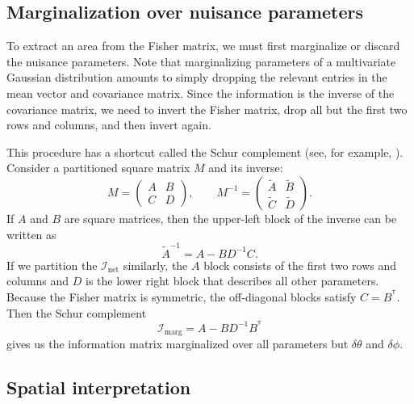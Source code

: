 \documentclass[amsmath,amssymb,aps,prx,reprint,nopreprintnumbers,nofootinbib,showpacs]{revtex4-1}
\newcommand\transpose{\ensuremath{^{^\mathsf{T}}}}
\begin{document}
\subsection{Marginalization over nuisance parameters}

To extract an area from the Fisher matrix, we must first marginalize or discard the nuisance parameters. Note that marginalizing parameters of a multivariate Gaussian distribution amounts to simply dropping the relevant entries in the mean vector and covariance matrix. Since the information is the inverse of the covariance matrix, we need to invert the Fisher matrix, drop all but the first two rows and columns, and then invert again.

This procedure has a shortcut called the Schur complement (see, for example, \citealt{numerical-recipes-inversion-partition}). Consider a partitioned square matrix $M$ and its inverse:
%
\begin{equation}
    M = \left(
        \begin{array}{cc}
            A & B \\
            C & D
        \end{array}
    \right), \qquad
    M^{-1} = \left(
        \begin{array}{cc}
            \tilde{A} & \tilde{B} \\
            \tilde{C} & \tilde{D}
        \end{array}
    \right).
\end{equation}
%
If $A$ and $B$ are square matrices, then the upper-left block of the inverse can be written as
%
\begin{equation}
    \tilde{A}^{-1} = A - B D^{-1} C.
\end{equation}
%
If we partition the $\mathcal{I}_\mathrm{net}$ similarly, the $A$ block consists of the first two rows and columns and $D$ is the lower right block that describes all other parameters. Because the Fisher matrix is symmetric, the off\nobreakdashes-diagonal blocks satisfy $C = B\transpose$. Then the Schur complement
%
\begin{equation}\label{eq:marginal-fisher-matrix}
    \mathcal{I}_\mathrm{marg} = A - B D^{-1} B\transpose
\end{equation}
%
gives us the information matrix marginalized over all parameters but $\delta\theta$ and $\delta\phi$.

\subsection{Spatial interpretation}
\end{document}
